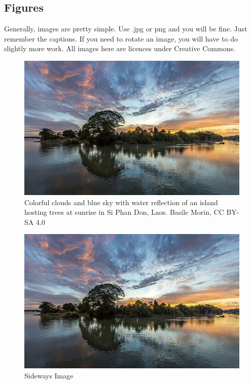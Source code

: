 \subsection{Figures}

Generally, images are pretty simple.  Use .jpg or png and you will be fine.  Just remember the captions.  If you need to rotate an image, you will have to do slightly more work.  All images here are licences under Creative Commons.

\begin{figure}[ht]
	\centering
	\includegraphics[width=0.7\linewidth]{./jpg/ColorfullSky.jpg}
	\caption[Colorfull Sky]{Colorful clouds and blue sky with water reflection of an island hosting trees at sunrise in Si Phan Don, Laos. Basile Morin, CC BY-SA 4.0}
	\label{fig:ColorSky}
\end{figure}


\begin{figure}
	\centering
	\includegraphics[width=1.0\linewidth]{./jpg/ColorfullSky.jpg}
	\caption{Sideways Image}
	\label{fig:SidewaysImage}
\end{figure}


